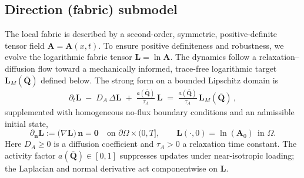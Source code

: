 \subsection*{Direction (fabric) submodel}\label{subsec:direction-nd}
The local fabric is described by a second-order, symmetric, positive-definite tensor field $\mathbf{A}=\mathbf{A}(x,t)$. To ensure positive definiteness and robustness, we evolve the logarithmic fabric tensor $\mathbf{L} = \ln \mathbf{A}$. The dynamics follow a relaxation--diffusion flow toward a mechanically informed, trace-free logarithmic target $\mathbf{L}_M(\bar{\mathbf{Q}})$ defined below. The strong form on a bounded Lipschitz domain is
\begin{equation}\label{eq:L-strong-nd}
\begin{aligned}
\partial_t \mathbf{L} \;-\; D_A\,\Delta \mathbf{L} \;+\; \frac{a(\bar{\mathbf{Q}})}{\tau_A}\,\mathbf{L}
\;=\; \frac{a(\bar{\mathbf{Q}})}{\tau_A}\,\mathbf{L}_M(\bar{\mathbf{Q}})\,,
\end{aligned}\end{equation}
supplemented with homogeneous no-flux boundary conditions and an admissible initial state,
\begin{equation}\label{eq:L-bc-ic-nd}
\partial_{\mathbf{n}}\mathbf{L}:=\big(\nabla \mathbf{L}\big)\,\mathbf{n}=\mathbf{0}\quad\text{on }\partial\Omega\times(0,T],
\qquad
\mathbf{L}(\cdot,0)=\ln(\mathbf{A}_0)\ \ \text{in }\Omega.
\end{equation}
Here $D_A\ge 0$ is a diffusion coefficient and $\tau_A>0$ a relaxation time constant. The activity factor $a(\bar{\mathbf{Q}})\in[0,1]$ suppresses updates under near-isotropic loading; the Laplacian and normal derivative act componentwise on $\mathbf{L}$.

